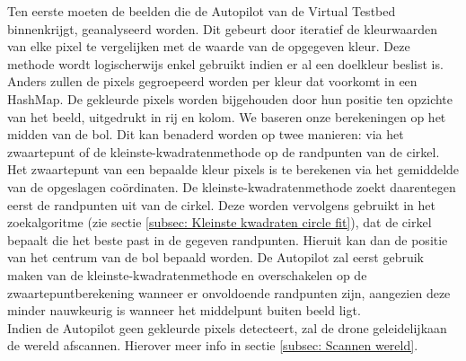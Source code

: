 \noindent
Ten eerste moeten de beelden die de Autopilot van de Virtual Testbed binnenkrijgt, geanalyseerd worden. Dit gebeurt door iteratief de kleurwaarden van elke pixel te vergelijken met de waarde van de opgegeven kleur. Deze methode wordt logischerwijs enkel gebruikt indien er al een doelkleur beslist is. Anders zullen de pixels gegroepeerd worden per kleur dat voorkomt in een HashMap. De gekleurde pixels worden bijgehouden door hun positie ten opzichte van het beeld, uitgedrukt in rij en kolom. We baseren onze berekeningen op het midden van de bol. Dit kan benaderd worden op twee manieren: via het zwaartepunt of de kleinste-kwadratenmethode op de randpunten van de cirkel. Het zwaartepunt van een bepaalde kleur pixels is te berekenen via het gemiddelde van de opgeslagen co\"ordinaten. De kleinste-kwadratenmethode zoekt daarentegen eerst de randpunten uit van de cirkel. Deze worden vervolgens gebruikt in het zoekalgoritme (zie sectie \ref{subsec: Kleinste kwadraten circle fit}), dat de cirkel bepaalt die het beste past in de gegeven randpunten. Hieruit kan dan de positie van het centrum van de bol bepaald worden. De Autopilot zal eerst gebruik maken van de kleinste-kwadratenmethode en overschakelen op de zwaartepuntberekening wanneer er onvoldoende randpunten zijn, aangezien deze minder nauwkeurig is wanneer het middelpunt buiten beeld ligt.
\\
Indien de Autopilot geen gekleurde pixels detecteert, zal de drone geleidelijkaan de wereld afscannen. Hierover meer info in sectie \ref{subsec: Scannen wereld}.